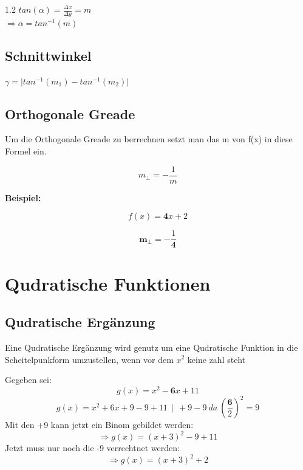 \documentclass{article}
\newcommand{\Zeilenabstand}{1.2}
\newcommand{\absatz}{5mm}
\begin{document}
\begin{spacing}{\Zeilenabstand}
    $ tan(\alpha) = \frac{\Delta x}{\Delta y } = m $\\
    $\Rightarrow \alpha = tan^{-1}(m)$

    \subsection{Schnittwinkel}

    $ \gamma = \vert tan^{-1}(m_1) - tan^{-1}(m_2)\vert $
    
    \subsection{Orthogonale Greade }

    Um die Orthogonale Greade zu berrechnen setzt man das m von f(x) in diese Formel ein.

    \begin{equation}
        m_{\bot} = -\frac{1}{m}
    \end{equation}

    \vspace{\absatz}

    \textbf{Beispiel:}

    \begin{equation}
        f(x) = \mathbf{4}x + 2
    \end{equation}

    \begin{equation}
        \mathbf{m}_{\bot} = -\frac{1}{\mathbf{4}}
    \end{equation}

    \newpage


    \section{Qudratische Funktionen}

    \subsection{Qudratische Ergänzung}

    Eine Qudratische Ergänzung wird genutz um eine Qudratische Funktion 
    in die Scheitelpunkform umzustellen, wenn vor dem $x^{2}$ keine zahl steht

    Gegeben sei: 
    \begin{equation}
         g(x) = x^2 - \textbf{6}x + 11 
    \end{equation}
    \begin{equation}
        g(x) =  x^2 + 6x + 9 - 9 + 11  \ \   \vert \ \ +9 -9\ da \  (\frac{\textbf{6}}{2})^2 = 9
    \end{equation}
    Mit den +9 kann jetzt ein Binom gebildet werden:
    \begin{equation}
        \Rightarrow g(x) = (x+3)^2 -9 +11 
    \end{equation}
    Jetzt muss nur noch die -9 verrechtnet werden:
    \begin{equation}
        \Rightarrow g(x) = (x+3)^2 + 2 
    \end{equation}


\end{spacing}
\end{document}
